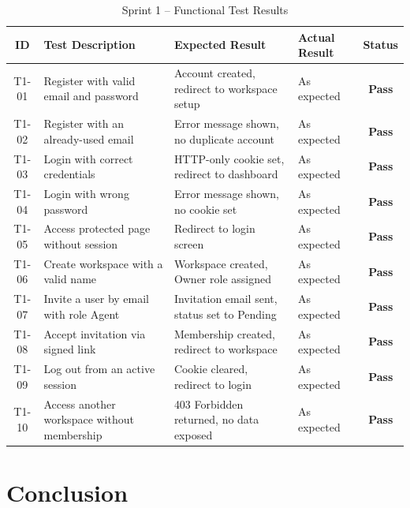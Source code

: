 \documentclass[12pt,a4paper]{report}
\newcommand{\tpass}{\textcolor{passgreen}{\textbf{Pass}}}
\begin{document}
\begin{table}[H]
  \centering
  \renewcommand{\arraystretch}{1.3}
  \begin{tabular}{|c|p{4.8cm}|p{4.2cm}|p{2cm}|c|}
    \hline
    \textbf{ID} & \textbf{Test Description} & \textbf{Expected Result} & \textbf{Actual Result} & \textbf{Status} \\
    \hline
    T1-01 & Register with valid email and password         & Account created, redirect to workspace setup & As expected & \tpass \\
    \hline
    T1-02 & Register with an already-used email            & Error message shown, no duplicate account    & As expected & \tpass \\
    \hline
    T1-03 & Login with correct credentials                 & HTTP-only cookie set, redirect to dashboard  & As expected & \tpass \\
    \hline
    T1-04 & Login with wrong password                      & Error message shown, no cookie set           & As expected & \tpass \\
    \hline
    T1-05 & Access protected page without session          & Redirect to login screen                     & As expected & \tpass \\
    \hline
    T1-06 & Create workspace with a valid name             & Workspace created, Owner role assigned       & As expected & \tpass \\
    \hline
    T1-07 & Invite a user by email with role Agent         & Invitation email sent, status set to Pending & As expected & \tpass \\
    \hline
    T1-08 & Accept invitation via signed link              & Membership created, redirect to workspace    & As expected & \tpass \\
    \hline
    T1-09 & Log out from an active session                 & Cookie cleared, redirect to login            & As expected & \tpass \\
    \hline
    T1-10 & Access another workspace without membership    & 403 Forbidden returned, no data exposed      & As expected & \tpass \\
    \hline
  \end{tabular}
  \caption{Sprint 1 -- Functional Test Results}
  \label{tab:test-s1}
\end{table}

\section*{Conclusion}
{}
\end{document}
